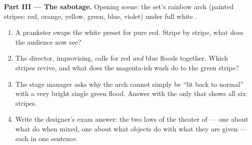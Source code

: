 \begin{problem}
\medskip\noindent\textbf{Part III --- The sabotage.}
Opening scene: the set's rainbow arch (painted stripes: red,
orange, yellow, green, blue, violet) under full white .
\begin{enumerate}[resume]
  \item A prankster swaps the white preset for pure red.
        Stripe by stripe, what does the audience now see?
  \item The director, improvising, calls for red \emph{and}
        blue floods together. Which stripes revive, and what
        does the magenta-ish wash do to the green stripe?
  \item The stage manager asks why the arch cannot simply be
        ``lit back to normal'' with a very bright single
        green flood. Answer with the only  that shows
        all six stripes.
  \item Write the designer's exam answer: the two laws of the
        theater of  --- one about what  do when
        mixed, one about what objects do with what they are
        given --- each in one sentence.
\end{enumerate}
\end{problem}

